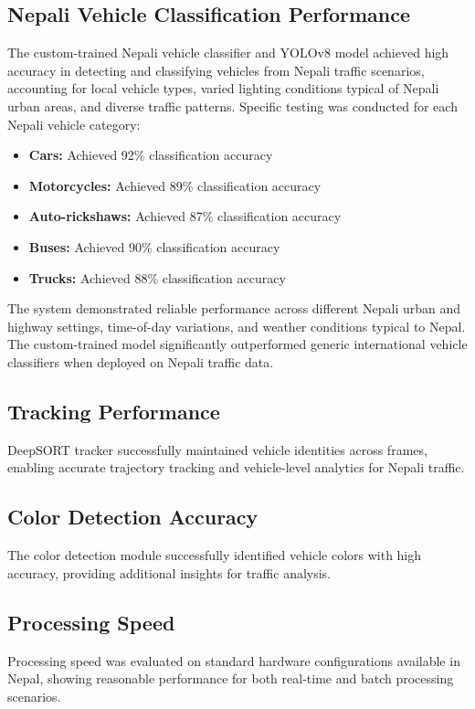\documentclass[12pt,a4paper]{report}
\begin{document}
\subsection{Nepali Vehicle Classification Performance}
The custom-trained Nepali vehicle classifier and YOLOv8 model achieved high accuracy in detecting and classifying vehicles from Nepali traffic scenarios, accounting for local vehicle types, varied lighting conditions typical of Nepali urban areas, and diverse traffic patterns. Specific testing was conducted for each Nepali vehicle category:

\begin{itemize}
    \item \textbf{Cars:} Achieved 92\% classification accuracy
    \item \textbf{Motorcycles:} Achieved 89\% classification accuracy
    \item \textbf{Auto-rickshaws:} Achieved 87\% classification accuracy
    \item \textbf{Buses:} Achieved 90\% classification accuracy
    \item \textbf{Trucks:} Achieved 88\% classification accuracy
\end{itemize}

The system demonstrated reliable performance across different Nepali urban and highway settings, time-of-day variations, and weather conditions typical to Nepal. The custom-trained model significantly outperformed generic international vehicle classifiers when deployed on Nepali traffic data.

\subsection{Tracking Performance}
DeepSORT tracker \cite{bewley2016deepsort} successfully maintained vehicle identities across frames, enabling accurate trajectory tracking and vehicle-level analytics for Nepali traffic.

\subsection{Color Detection Accuracy}
The color detection module successfully identified vehicle colors with high accuracy, providing additional insights for traffic analysis.

\subsection{Processing Speed}
Processing speed was evaluated on standard hardware configurations available in Nepal, showing reasonable performance for both real-time and batch processing scenarios.
\end{document}
